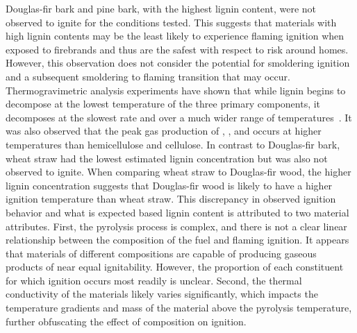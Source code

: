     Douglas-fir bark and pine bark, with the highest lignin content, were not observed to ignite for the conditions tested. This suggests that materials with high lignin contents may be the least likely to experience flaming ignition when exposed to firebrands and thus are the safest with respect to risk around homes. However, this observation does not consider the potential for smoldering ignition and a subsequent smoldering to flaming transition that may occur. Thermogravimetric analysis experiments have shown that while lignin begins to decompose at the lowest temperature of the three primary components, it decomposes at the slowest rate and over a much wider range of temperatures~\cite{Yang2007a}. It was also observed that the peak gas production of , , and  occurs at higher temperatures than hemicellulose and cellulose. In contrast to Douglas-fir bark, wheat straw had the lowest estimated lignin concentration but was also not observed to ignite. When comparing wheat straw to Douglas-fir wood, the higher lignin concentration suggests that Douglas-fir wood is likely to have a higher ignition temperature than wheat straw. This discrepancy in observed ignition behavior and what is expected based lignin content is attributed to two material attributes. First, the pyrolysis process is complex, and there is not a clear linear relationship between the composition of the fuel and flaming ignition. It appears that materials of different compositions are capable of producing gaseous products of near equal ignitability. However, the proportion of each constituent for which ignition occurs most readily is unclear. Second, the thermal conductivity of the materials likely varies significantly, which impacts the temperature gradients and mass of the material above the pyrolysis temperature, further obfuscating the effect of composition on ignition. 
    
